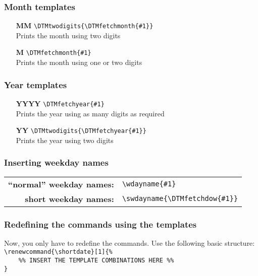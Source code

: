 \documentclass[11pt]{ltxdoc}
\begin{document}
	\subsubsection*{Month templates}
	\begin{itemize}
		\item[\sffamily\bfseries MM]
		\verb|\DTMtwodigits{\DTMfetchmonth{#1}}| \\
		Prints the month using two digits

		\item[\sffamily\bfseries M]
		\verb|\DTMfetchmonth{#1}| \\
		Prints the month using one or two digits
	\end{itemize}
	
	\subsubsection*{Year templates}
	\begin{itemize}
		\item[\sffamily\bfseries YYYY]
		\verb|\DTMfetchyear{#1}| \\
		Prints the year using as many digits as required
		
		\item[\sffamily\bfseries YY]
		\verb|\DTMtwodigits{\DTMfetchyear{#1}}| \\
		Prints the year using two digits
	\end{itemize}
	
	\subsubsection*{Inserting weekday names}
	\begin{tabular}{>{\sffamily\bfseries}rl}
		\enquote{normal} weekday names: & \verb|\wdayname{#1}|                \\
		           short weekday names: & \verb|\swdayname{\DTMfetchdow{#1}}|
	\end{tabular}
	
	\subsubsection*{Redefining the commands using the templates}
	Now, you only have to redefine the commands. Use the following basic structure: \\
	\verb|\renewcommand{\shortdate}[1]{%| \\
	\verb|    %% INSERT THE TEMPLATE COMBINATIONS HERE %%| \\
	\verb|}|
	
\end{document}

